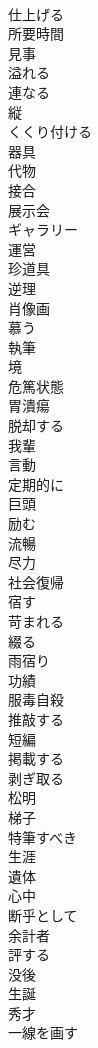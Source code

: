 \documentclass[8pt]{extreport}
\begin{document}
\begin{CJK}{UTF8}{min}
\\	仕上げる
\\	所要時間
\\	見事
\\	溢れる
\\	連なる
\\	縦
\\	くくり付ける
\\	器具
\\	代物
\\	接合
\\	展示会
\\	ギャラリー
\\	運営
\\	珍道具
\\	逆理
\\	肖像画
\\	慕う
\\	執筆
\\	境
\\	危篤状態
\\	胃潰瘍
\\	脱却する
\\	我輩
\\	言動
\\	定期的に
\\	巨頭
\\	励む
\\	流暢
\\	尽力
\\	社会復帰
\\	宿す
\\	苛まれる
\\	綴る
\\	雨宿り
\\	功績
\\	服毒自殺
\\	推敲する
\\	短編
\\	掲載する
\\	剥ぎ取る
\\	松明
\\	梯子
\\	特筆すべき
\\	生涯
\\	遺体
\\	心中
\\	断乎として
\\	余計者
\\	評する
\\	没後
\\	生誕
\\	秀才
\\	一線を画す

\end{CJK}
\end{document}
